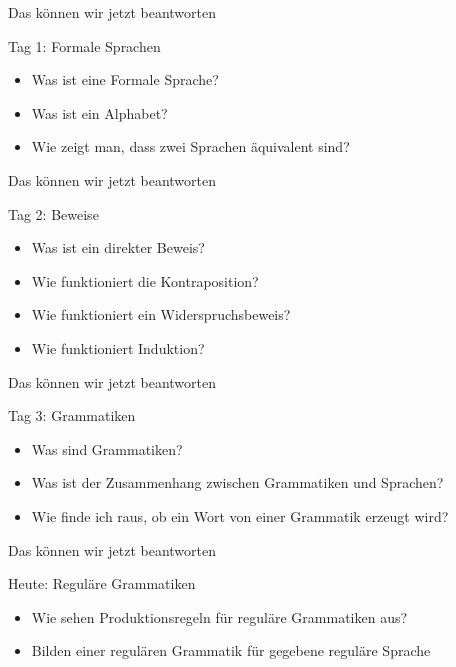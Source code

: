 \begin{frame}[fragile]{Das können wir jetzt beantworten}
	\begin{alertblock}{Tag 1: Formale Sprachen}
		\begin{itemize}
			\item Was ist eine Formale Sprache?
			\item Was ist ein Alphabet?
			\item Wie zeigt man, dass zwei Sprachen äquivalent sind?
		\end{itemize}
	\end{alertblock}
\end{frame}

\begin{frame}[fragile]{Das können wir jetzt beantworten}
    \begin{alertblock}{Tag 2: Beweise}
    \begin{itemize}
        \item Was ist ein direkter Beweis?
        \item Wie funktioniert die Kontraposition?
        \item Wie funktioniert ein Widerspruchsbeweis?
        \item Wie funktioniert Induktion?
    \end{itemize}
    \end{alertblock}
\end{frame}

\begin{frame}[fragile]{Das können wir jetzt beantworten}
    \begin{alertblock}{Tag 3: Grammatiken}
    \begin{itemize}
        \item Was sind Grammatiken?
        \item Was ist der Zusammenhang zwischen Grammatiken und Sprachen?
        \item Wie finde ich raus, ob ein Wort von einer Grammatik erzeugt wird?
    \end{itemize}
    \end{alertblock}
\end{frame}

\begin{frame}[fragile]{Das können wir jetzt beantworten}
	\begin{alertblock}{Heute: Reguläre Grammatiken}
		\begin{itemize}
			\item Wie sehen Produktionsregeln für reguläre Grammatiken aus?
			\item Bilden einer regulären Grammatik für gegebene reguläre Sprache
		\end{itemize}
	\end{alertblock}
\end{frame}

